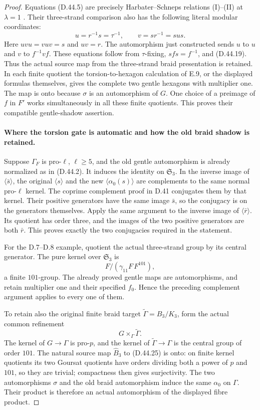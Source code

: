 \begin{proof}
Equations \textup{(D.44.5)}
are precisely Harbater--Schneps
relations (I)--(II) at
\(\lambda=1\)
\cite[\S0.1, (I)--(II);
Proposition~4]{DE_HarbaterSchneps2000}.
Their three-strand comparison
also has the following literal
modular coordinates:
\[
                    u=r^{-1}s=\tau^{-1},
           \qquad v=sr^{-1}=s u s .
 \tag{D.44.23}
\]
Here \(uvu=vuv=s\) and \(uv=r\).
The automorphism just constructed
sends \(u\) to \(u\) and
\(v\) to \(f^{-1}v f\).
These equations follow from
\(\tau\)-fixing, \(sfs=f^{-1}\),
and \textup{(D.44.19)}.
Thus the actual source map
from the three-strand braid
presentation is retained.
In each finite quotient the
torsion-to-hexagon calculation
of E.9, or the displayed
formulas themselves, gives
the complete two gentle
hexagons with multiplier one.
The map is onto because
\(\sigma\) is an automorphism
of \(G\).
One choice of a preimage
of \(f\) in \(F'\) works
simultaneously in all these
finite quotients.
This proves their compatible
gentle-shadow assertion.

\paragraph{Where the torsion gate is automatic and how the old braid shadow is retained.}
Suppose \(\Gamma_F\) is
pro-\(\ell\), \(\ell\geq5\),
and the old gentle
automorphism is already
normalized as in
\textup{(D.44.2)}.
It induces the identity on
\(\mathfrak S_3\).
In the inverse image of
\(\langle\bar s\rangle\),
the original \(\langle s\rangle\)
and the new
\(\langle\alpha_0(s)\rangle\)
are complements to the same
normal pro-\(\ell\) kernel.
The coprime complement proof
in D.41 conjugates them
by that kernel.
Their positive generators
have the same image
\(\bar s\), so the conjugacy
is on the generators
themselves.
Apply the same argument
to the inverse image of
\(\langle\bar r\rangle\).
Its quotient has order three,
and the images of the two
positive generators are
both \(\bar r\).
This proves exactly the
two conjugacies required
in the statement.

For the D.7--D.8 example,
quotient the actual three-strand
group by its central
generator.
The pure kernel over
\(\mathfrak S_3\) is
\[
                 F/(\gamma_{11}F\,F^{101}),
 \tag{D.44.24}
\]
a finite \(101\)-group.
The already proved gentle
maps are automorphisms,
and retain multiplier one
and their specified \(f_0\).
Hence the preceding complement
argument applies to every
one of them.

To retain also the original
finite braid target
\(\widetilde\Gamma=B_3/K_3\),
form the actual common
refinement
\[
             G\mathbin{\times_\Gamma}
                         \widetilde\Gamma .
 \tag{D.44.25}
\]
The kernel of \(G\to\Gamma\)
is pro-\(p\), and the
kernel of
\(\widetilde\Gamma\to\Gamma\)
is the central group of
order \(101\).
The natural source map
\(\widehat B_3\) to
\textup{(D.44.25)} is onto:
on finite kernel quotients
its two Goursat quotients
have orders dividing
both a power of \(p\)
and \(101\), so they
are trivial; compactness
then gives surjectivity.
The two automorphisms
\(\sigma\) and the old
braid automorphism induce
the same \(\alpha_0\)
on \(\Gamma\).
Their product is therefore
an actual automorphism
of the displayed fibre
product.


\end{proof}
